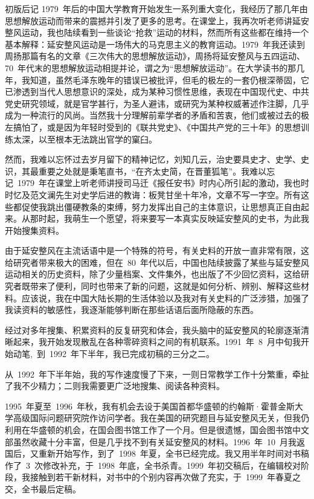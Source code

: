 \begin{pre-post-text}{初版后记}
1979~年后的中国大学教育开始发生一系列重大变化，我经历了那几年由思想解放运动而带来的震撼并引发了更多的思考。在课堂上，我再次听老师讲延安整风运动，我也陆续看到一些谈论“抢救”运动的材料，然而所有这些都在维持一个基本解释：延安整风运动是一场伟大的马克思主义的教育运动。1979~年我还读到周扬那篇有名的文章《三次伟大的思想解放运动》，周扬将延安整风与五四运动、70~年代末的思想解放运动相提并论，谓之为“思想解放运动”。在大学读书的那几年，我知道，虽然毛泽东晚年的错误已被批评，但毛的极左的一套仍根深蒂固，它已渗透到当代人思想意识的深处，成为某种习惯性思维，表现在中国现代史、中共党史研究领域，就是官学甚行，为圣人避讳，或研究为某种权威著述作注脚，几乎成为一种流行的风尚。当然我十分理解前辈学者的矛盾和苦衷，他们或被过去的极左搞怕了，或是因为年轻时受到的《联共党史》、《中国共产党的三十年》的思想训练太深，以至根本无法跳出官学的窠臼。

然而，我难以忘怀过去岁月留下的精神记忆，刘知几云，治史要具史才、史学、史识，其最重要之处就是秉笔直书，“在齐太史简，在晋董狐笔”。我难以忘记~1979~年在课堂上听老师讲授司马迁《报任安书》时内心所引起的激动，我也时时忆及范文澜先生对史学后进的教诲：板凳甘坐十年冷，文章不写一字空。所有这些都促使我跳出僵硬教条的束缚，努力发挥出自己的主体意识，让思想真正自由起来。从那时起，我萌生一个愿望，将来要写一本真实反映延安整风的史书，为此我开始搜集资料。

由于延安整风在主流话语中是一个特殊的符号，有关史料的开放一直非常有限，这给研究者带来极大的困难，但在~80~年代以后，中国也陆续披露了某些与延安整风运动相关的历史资料，除了少量档案、文件集外，也出版了不少回忆资料，这给研究者既带来了便利，同时也带来了新的问题，这就是如何分析、辨别、解释这些材料。应该说，我在中国大陆长期的生活体验以及我对有关史料的广泛涉猎，加强了我读资料的敏感性，我逐渐能够判断在那些话语后面所隐蔽的东西。

经过对多年搜集、积累资料的反复研究和体会，我头脑中的延安整风的轮廓逐渐清晰起来，我开始发现散乱在各种零碎资料之间的有机联系。1991~年~8~月中旬我开始动笔,~到~1992~年下半年，我已完成初稿的三分之二。

从~1992~年下半年始，我的写作速度慢了下来，一则日常教学工作十分繁重，牵扯了我不少精力；二则我需要更广泛地搜集、阅读各种资料。

1995~年夏至~1996~年秋，我有机会去设于美国首都华盛顿的约翰斯·霍普金斯大学高级国际问题研究院作访问学者。我在美国的研究题目与延安整风无关，但我仍利用在华盛顿的机会，在国会图书馆工作了一个月。但是很遗憾，国会图书馆中文部虽然收藏十分丰富，但是几乎找不到有关延安整风的材料。1996~年~10~月我返国后，又重新开始写作，到了~1998~年夏，全书已经完成。我又用半年时间对书稿作了~3~次修改补充，于~1998~年底，全书杀青。1999~年初交稿后，在编辑校对阶段，我接触到若干新材料，对书中的个别内容再次做了充实，于~1999~年春夏之交，全书最后定稿。


\end{pre-post-text}
